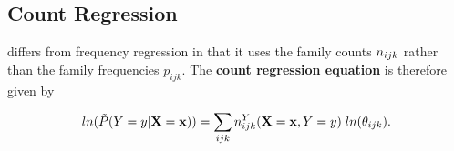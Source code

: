 \documentclass[twoside,leqno,twocolumn]{article}
\begin{document}


%


\subsection{Count Regression} \label{sec:count}
 differs from frequency regression in that it uses the family counts $n_{ijk}$ rather than the family frequencies $p_{ijk}$. The \textbf{count regression equation} is therefore given by 

\begin{equation} \label{eq:regress-count}
ln(\tilde{P}(Y = y|\mathbf{X}=\mathbf{x})) = \sum_{ijk} n^{Y}_{ijk}(\mathbf{X}=\mathbf{x},Y = y) \; ln(\theta_{ijk}).\end{equation}
\end{document}
